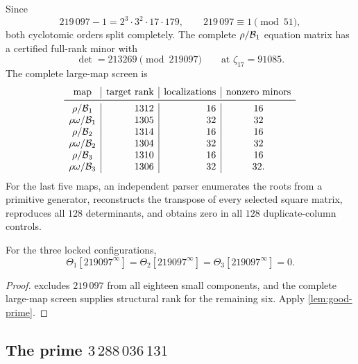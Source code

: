 Since
\[
 219\,097-1=2^3\cdot3^2\cdot17\cdot179,
 \qquad 219\,097\equiv1\pmod {51},
\]
both cyclotomic orders split completely.  The complete
\(\rho/\mathcal B_1\) equation matrix has a certified full-rank minor with
\[
 \det=213269\pmod {219097}
 \qquad\text{at }\zeta_{17}=91085.
\]
The complete large-map screen is
\[
\begin{array}{c|r|r|c}
\text{map}&\text{target rank}&\text{localizations}&\text{nonzero minors}\\
\midrule
\rh/\cB_1&1312&16&16\\
\rh\om/\cB_1&1305&32&32\\
\rh/\cB_2&1314&16&16\\
\rh\om/\cB_2&1304&32&32\\
\rh/\cB_3&1310&16&16\\
\rh\om/\cB_3&1306&32&32.
\end{array}
\]
For the last five maps, an independent parser enumerates the roots from a
primitive generator, reconstructs the transpose of every selected square
matrix, reproduces all \(128\) determinants, and obtains zero in all
\(128\) duplicate-column controls.

\begin{theorem}
\label{thm:theta219097}
For the three locked configurations,
\[
 \Theta_1[219097^\infty]
 =\Theta_2[219097^\infty]
 =\Theta_3[219097^\infty]
 =0.
\]
\end{theorem}

\begin{proof}
 excludes \(219\,097\) from all eighteen
small components, and the complete large-map screen supplies structural
rank for the remaining six.  Apply \cref{lem:good-prime}.
\end{proof}

\subsection{The prime \(3\,288\,036\,131\)}

